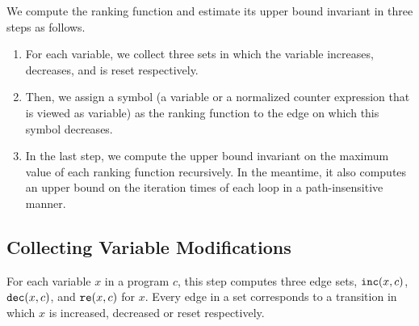 We compute the ranking function and estimate its upper bound invariant in three steps as follows.

\begin{enumerate}
 \item For each variable, we collect three sets 
 in which the variable increases, decreases, and is reset respectively.
 \item
 Then, we assign a symbol (a variable or a normalized counter expression that is viewed as variable)  as the ranking function to the edge on which this symbol decreases.
 \item
 In the last step, we compute the upper bound invariant on the maximum value of each ranking function recursively.
 In the meantime, it also computes an upper bound on the iteration times of each loop in a path-insensitive manner.
 \end{enumerate}

 \subsection{Collecting Variable Modifications}
 For each variable $x$ in a program $c$, this step computes three edge sets, $\mathtt{inc}(x, c)$, $\mathtt{dec}(x, c)$,
 and $\mathtt{re}(x, c)$ for $x$.
 Every edge in a set corresponds to a transition in which $x$ is increased,
 decreased
 or reset
 respectively.

